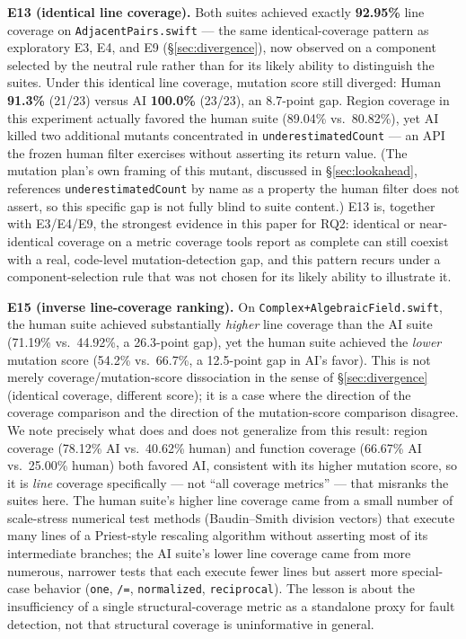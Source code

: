 \documentclass[10pt,conference]{IEEEtran}
\begin{document}
\textbf{E13 (identical line coverage).} Both suites achieved exactly \textbf{92.95\%} line coverage on \texttt{AdjacentPairs.swift} — the same identical-coverage pattern as exploratory E3, E4, and E9 (\S\ref{sec:divergence}), now observed on a component selected by the neutral rule rather than for its likely ability to distinguish the suites. Under this identical line coverage, mutation score still diverged: Human \textbf{91.3\%} (21/23) versus AI \textbf{100.0\%} (23/23), an 8.7-point gap. Region coverage in this experiment actually favored the human suite (89.04\% vs.\ 80.82\%), yet AI killed two additional mutants concentrated in \texttt{underestimatedCount} — an API the frozen human filter exercises without asserting its return value. (The mutation plan's own framing of this mutant, discussed in \S\ref{sec:lookahead}, references \texttt{underestimatedCount} by name as a property the human filter does not assert, so this specific gap is not fully blind to suite content.) E13 is, together with E3/E4/E9, the strongest evidence in this paper for RQ2: identical or near-identical coverage on a metric coverage tools report as complete can still coexist with a real, code-level mutation-detection gap, and this pattern recurs under a component-selection rule that was not chosen for its likely ability to illustrate it.

\textbf{E15 (inverse line-coverage ranking).} On \texttt{Complex+AlgebraicField.swift}, the human suite achieved substantially \emph{higher} line coverage than the AI suite (71.19\% vs.\ 44.92\%, a 26.3-point gap), yet the human suite achieved the \emph{lower} mutation score (54.2\% vs.\ 66.7\%, a 12.5-point gap in AI's favor). This is not merely coverage/mutation-score dissociation in the sense of \S\ref{sec:divergence} (identical coverage, different score); it is a case where the direction of the coverage comparison and the direction of the mutation-score comparison disagree. We note precisely what does and does not generalize from this result: region coverage (78.12\% AI vs.\ 40.62\% human) and function coverage (66.67\% AI vs.\ 25.00\% human) both favored AI, consistent with its higher mutation score, so it is \emph{line} coverage specifically — not ``all coverage metrics'' — that misranks the suites here. The human suite's higher line coverage came from a small number of scale-stress numerical test methods (Baudin–Smith division vectors) that execute many lines of a Priest-style rescaling algorithm without asserting most of its intermediate branches; the AI suite's lower line coverage came from more numerous, narrower tests that each execute fewer lines but assert more special-case behavior (\texttt{one}, \texttt{/=}, \texttt{normalized}, \texttt{reciprocal}). The lesson is about the insufficiency of a single structural-coverage metric as a standalone proxy for fault detection, not that structural coverage is uninformative in general.
\end{document}
